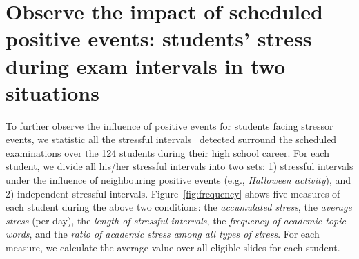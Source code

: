 \appendix
\section{Observe the impact of scheduled positive events: students' stress during exam intervals in two situations}



To further observe the influence of positive events for students facing stressor events,
we statistic all the stressful intervals~\cite{Li2017Analyzing} detected surround the scheduled examinations over the 124 students during their high school career.
For each student, we divide all his/her stressful intervals into two sets:
1) stressful intervals under the influence of neighbouring positive events (e.g., \emph{Halloween activity}), and 2) independent stressful intervals.
Figure~\ref{fig:frequency} shows five measures of each student during the above two conditions:
the \emph{accumulated stress}, the \emph{average stress} (per day), the \emph{length of stressful intervals},
the \emph{frequency of academic topic words}, and the \emph{ratio of academic stress among all types of stress}.
For each measure, we calculate the average value over all eligible slides for each student.

